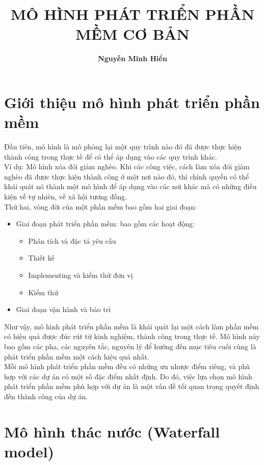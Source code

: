 \documentclass[14pt]{extarticle}
\title{\textbf{MÔ HÌNH PHÁT TRIỂN PHẦN MỀM CƠ BẢN}}
\author{\textbf{Nguyễn Minh Hiển}}
\begin{document}
\newpage
\maketitle
\tableofcontents
\newpage
\section*{Giới thiệu mô hình phát triển phần mềm}

Đầu tiên, mô hình là mô phỏng lại một quy trình nào đó đã được thực hiện thành công
trong thực tế để có thể áp dụng vào các quy trình khác.\\
Ví dụ: Mô hình xóa đói giảm nghèo. Khi các công việc, cách làm xóa đói
giảm nghèo đã được thực hiện thành công ở một nơi nào đó, thì chính quyền
có thể khái quát nó thành một mô hình để áp dụng vào các nơi khác mà có
những điều kiện về tự nhiên, về xã hội tương đồng.\\

Thứ hai, vòng đời của một phần mềm bao gồm hai giai đoạn:
\begin{itemize}
  \item Giai đoạn phát triển phần mềm: bao gồm các hoạt động:
        \begin{itemize}
          \item Phân tích và đặc tả yêu cầu
          \item Thiết kế
          \item Implementing và kiểm thử đơn vị
          \item Kiểm thử
        \end{itemize}
  \item Giai đoạn vận hành và bảo trì
\end{itemize}

Như vậy, mô hình phát triển phần mềm là khái quát lại một cách làm
phần mềm có hiệu quả được đúc rút từ kinh nghiệm, thành công trong thực tế. Mô hình
này bao gồm các pha, các nguyên tắc, nguyên lý để hướng
đến mục tiêu cuối cùng là phát triển phần mềm một cách hiệu
quả nhất.\\

Mỗi mô hình phát triển phần mềm đều có những ưu nhược điểm
riêng, và phù hợp với các dự án có một số đặc điểm nhất định.
Do đó, việc lựa chọn mô hình phát triển phần mềm phù hợp với
dự án là một vấn đề tối quan trọng quyết định đến thành công của dự án.
\newpage
\section{Mô hình thác nước (Waterfall model)} \label{sec:waterfall}
\end{document}
